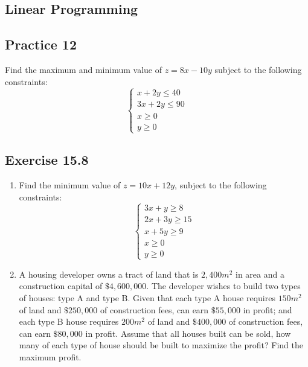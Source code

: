 \documentclass{report}
\begin{document}
\begin{multicols}{2}
    \section{Linear Programming}

    \subsection{Practice 12}
    Find the maximum and minimum value of $z = 8x - 10y$ subject to the following
    constraints: \[\begin{cases}
            x + 2y \leq 40  \\
            3x + 2y \leq 90 \\
            x \geq 0        \\
            y \geq 0
        \end{cases}\]

    \subsection{Exercise 15.8}
    \begin{enumerate}
        \item Find the minimum value of $z = 10x + 12y$, subject to the following
              constraints: \[\begin{cases}
                      3x + y \geq 8   \\
                      2x + 3y \geq 15 \\
                      x + 5y \geq 9   \\
                      x \geq 0        \\
                      y \geq 0
                  \end{cases}\]
        \item A housing developer owns a tract of land that is $2,400 m^2$ in area and a
              construction capital of $\$4,600,000$. The developer wishes to build two types
              of houses: type A and type B. Given that each type A house requires $150 m^2$
              of land and $\$250,000$ of construction fees, can earn $\$55,000$ in profit;
              and each type B house requires $200 m^2$ of land and $\$400,000$ of
              construction fees, can earn $\$80,000$ in profit. Assume that all houses built
              can be sold, how many of each type of house should be built to maximize the
              profit? Find the maximum profit.


\end{enumerate}
\end{multicols}
\end{document}
